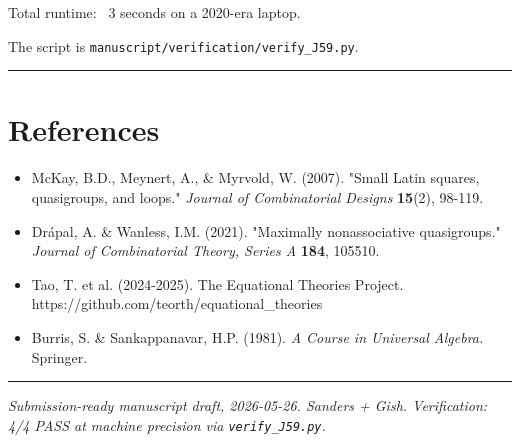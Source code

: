 \documentclass[11pt,reqno]{amsart}
\theoremstyle{plain}
\theoremstyle{definition}
\begin{document}
Total runtime: ~3 seconds on a 2020-era laptop.

The script is \texttt{manuscript/verification/verify_J59.py}.

\medskip\hrule\medskip

\section{References}

\begin{itemize}
\item McKay, B.D., Meynert, A., \& Myrvold, W. (2007). "Small Latin squares, quasigroups, and loops." \textit{Journal of Combinatorial Designs} \textbf{15}(2), 98-119.
\item Drápal, A. \& Wanless, I.M. (2021). "Maximally nonassociative quasigroups." \textit{Journal of Combinatorial Theory, Series A} \textbf{184}, 105510.
\item Tao, T. et al. (2024-2025). The Equational Theories Project. https://github.com/teorth/equational_theories
\item Burris, S. \& Sankappanavar, H.P. (1981). \textit{A Course in Universal Algebra.} Springer.
\end{itemize}

\medskip\hrule\medskip

\textit{Submission-ready manuscript draft, 2026-05-26. Sanders + Gish. Verification: 4/4 PASS at machine precision via \texttt{verify_J59.py}.}
\end{document}
